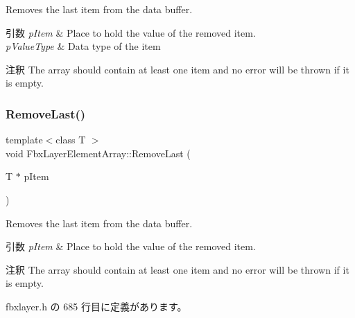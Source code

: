 Removes the last item from the data buffer. 
\begin{DoxyParams}{引数}
{\em p\+Item} & Place to hold the value of the removed item. \\
\hline
{\em p\+Value\+Type} & Data type of the item \\
\hline
\end{DoxyParams}
\begin{DoxyRemark}{注釈}
The array should contain at least one item and no error will be thrown if it is empty. 
\end{DoxyRemark}
\mbox{\label{class_fbx_layer_element_array_a33eabc8ad1f5a95f5238a81293728717}} 
\subsubsection{\texorpdfstring{Remove\+Last()}{RemoveLast()}\hspace{0.1cm}{\footnotesize\ttfamily [2/2]}}
{\footnotesize\ttfamily template$<$class T $>$ \\
void Fbx\+Layer\+Element\+Array\+::\+Remove\+Last (\begin{DoxyParamCaption}\item[{T $\ast$}]{p\+Item }\end{DoxyParamCaption})\hspace{0.3cm}{\ttfamily [inline]}}

Removes the last item from the data buffer. 
\begin{DoxyParams}{引数}
{\em p\+Item} & Place to hold the value of the removed item. \\
\hline
\end{DoxyParams}
\begin{DoxyRemark}{注釈}
The array should contain at least one item and no error will be thrown if it is empty. 
\end{DoxyRemark}


 fbxlayer.\+h の 685 行目に定義があります。

\mbox{\label{class_fbx_layer_element_array_a7dff6a6150f4dff69c83070a7c675db6}} 
